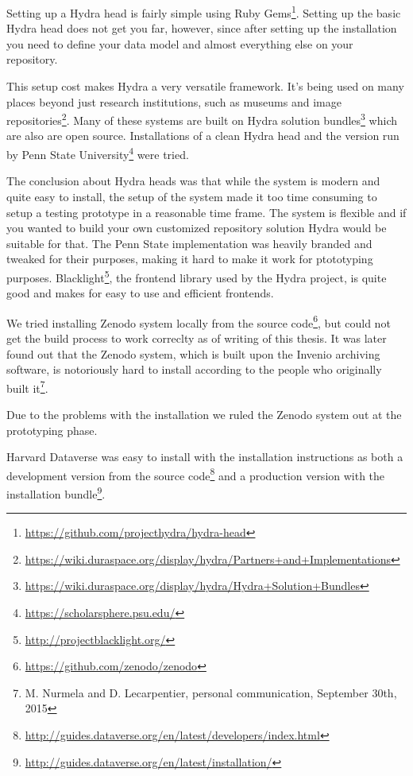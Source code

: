 Setting up a Hydra head is fairly simple using Ruby
Gems\footnote{\url{https://github.com/projecthydra/hydra-head}}.
Setting up the basic Hydra head
does not get you far, however, since after setting up the installation you need
to define your data model and almost everything else on your repository.

This setup cost makes Hydra a very versatile framework. It's being used on many
places beyond just research institutions, such as museums and image
repositories\footnote{\url{https://wiki.duraspace.org/display/hydra/Partners+and+Implementations}}.
Many of these systems are built on Hydra solution
bundles\footnote{\url{https://wiki.duraspace.org/display/hydra/Hydra+Solution+Bundles}}
which are also
are open source. Installations of a clean Hydra head and the version
run by Penn State University\footnote{\url{https://scholarsphere.psu.edu/}} were tried.

The conclusion about Hydra heads was that while the system is modern and quite
easy to install, the setup of the system made it too time consuming to setup a
testing prototype in a reasonable time frame. The system is flexible and if you
wanted to build your own customized repository solution Hydra would be suitable
for that. The Penn State implementation was heavily branded and tweaked for
their purposes, making it hard to make it work for ptototyping purposes.
Blacklight\footnote{\url{http://projectblacklight.org/}},
the frontend library used by the Hydra
project, is quite good and makes for easy to use and efficient frontends.

We tried installing Zenodo system locally from the source
code\footnote{\url{https://github.com/zenodo/zenodo}}, but could not get the
build process to work correclty as of writing of this thesis.
It was later found out that the Zenodo system, which is built upon the Invenio
archiving software, is notoriously hard to install according to the people who
originally built it\footnote{M. Nurmela and D. Lecarpentier, personal
communication, September 30th, 2015}.

Due to the problems with the installation we ruled the Zenodo system out at
the prototyping phase.

Harvard Dataverse was easy to install with the installation instructions as
both a development version from the source
code\footnote{\url{http://guides.dataverse.org/en/latest/developers/index.html}} and a
production version with
the installation bundle\footnote{\url{http://guides.dataverse.org/en/latest/installation/}}.

